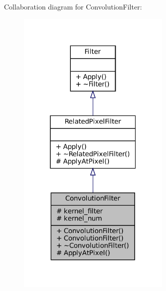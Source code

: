 Collaboration diagram for Convolution\+Filter\+:\nopagebreak
\begin{figure}[H]
\begin{center}
\leavevmode
\includegraphics[width=208pt]{classConvolutionFilter__coll__graph}
\end{center}
\end{figure}
